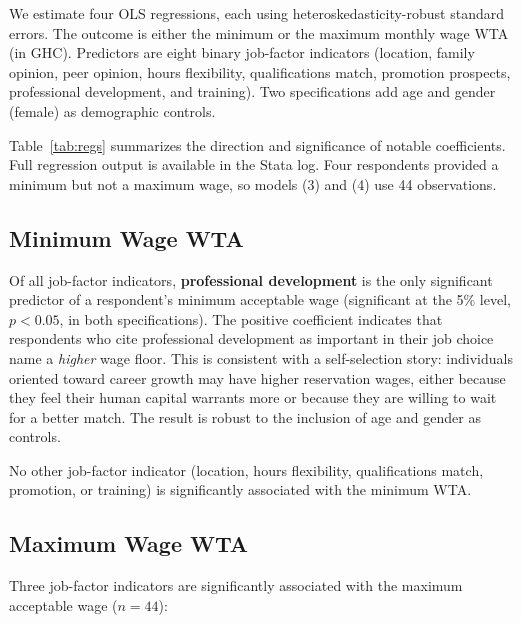 \documentclass[12pt]{article}
\begin{document}
We estimate four OLS regressions, each using heteroskedasticity-robust standard
errors. The outcome is either the minimum or the maximum monthly wage WTA
(in GHC). Predictors are eight binary job-factor indicators
(location, family opinion, peer opinion, hours flexibility, qualifications match,
promotion prospects, professional development, and training). Two specifications
add age and gender (female) as demographic controls.

Table~\ref{tab:regs} summarizes the direction and significance of notable
coefficients. Full regression output is available in the Stata log. Four
respondents provided a minimum but not a maximum wage, so models (3) and (4)
use 44 observations.



\subsection{Minimum Wage WTA}

Of all job-factor indicators, \textbf{professional development} is the only
significant predictor of a respondent's minimum acceptable wage (significant at
the 5\% level, $p < 0.05$, in both specifications). The positive coefficient
indicates that respondents who cite professional development as important in their
job choice name a \emph{higher} wage floor. This is consistent with a
self-selection story: individuals oriented toward career growth may have higher
reservation wages, either because they feel their human capital warrants more or
because they are willing to wait for a better match. The result is robust to
the inclusion of age and gender as controls.

No other job-factor indicator (location, hours flexibility, qualifications match,
promotion, or training) is significantly associated with the minimum WTA.

\subsection{Maximum Wage WTA}

Three job-factor indicators are significantly associated with the maximum
acceptable wage ($n = 44$):
\end{document}
